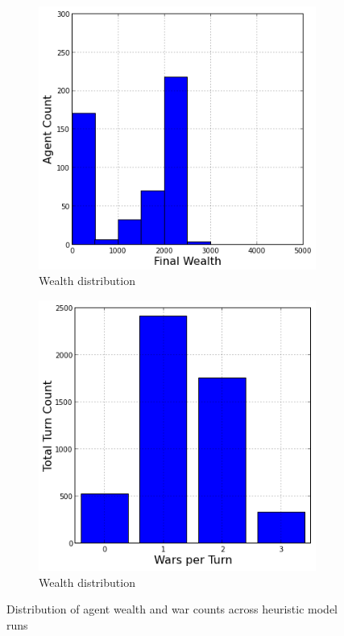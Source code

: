 \documentclass{article}
\begin{document}
\begin{figure}[h!]
	\begin{subfigure}{0.49\textwidth}
		\includegraphics[width=\textwidth]{Graphics/Exp1WealthDistribution}
		\caption{Wealth distribution}
	\end{subfigure}
	\begin{subfigure}{0.49\textwidth}
		\includegraphics[width=\textwidth]{Graphics/Exp1WarDistribution}
		\caption{Wealth distribution}
	\end{subfigure}
\caption{Distribution of agent wealth and war counts across heuristic model runs}
\end{figure}
\end{document}
